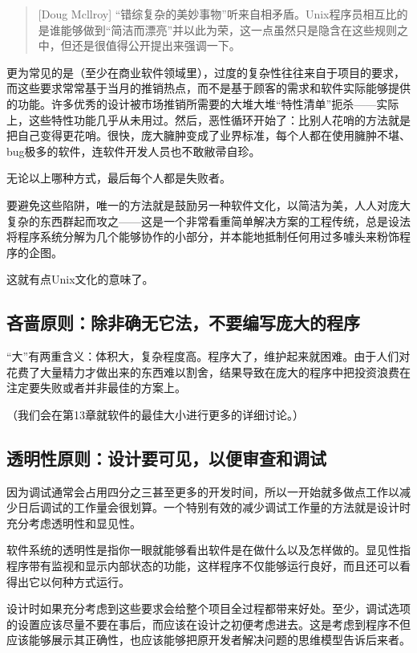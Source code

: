 \documentclass[11pt,oneside]{book}
\begin{document}
\begin{common-format}
\begin{quote}[Doug Mcllroy]
“错综复杂的美妙事物”听来自相矛盾。Unix程序员相互比的是谁能够做到“简洁而漂亮”并以此为荣，这一点虽然只是隐含在这些规则之中，但还是很值得公开提出来强调一下。
\end{quote}    

更为常见的是（至少在商业软件领域里），过度的复杂性往往来自于项目的要求，而这些要求常常基于当月的推销热点，而不是基于顾客的需求和软件实际能够提供的功能。许多优秀的设计被市场推销所需要的大堆大堆“特性清单”扼杀——实际上，这些特性功能几乎从未用过。然后，恶性循环开始了：比别人花哨的方法就是把自己变得更花哨。很快，庞大臃肿变成了业界标准，每个人都在使用臃肿不堪、bug极多的软件，连软件开发人员也不敢敝帚自珍。

无论以上哪种方式，最后每个人都是失败者。

要避免这些陷阱，唯一的方法就是鼓励另一种软件文化，以简洁为美，人人对庞大复杂的东西群起而攻之——这是一个非常看重简单解决方案的工程传统，总是设法将程序系统分解为几个能够协作的小部分，并本能地抵制任何用过多噱头来粉饰程序的企图。
    
这就有点Unix文化的意味了。


\subsection{吝啬原则：除非确无它法，不要编写庞大的程序}
“大”有两重含义：体积大，复杂程度高。程序大了，维护起来就困难。由于人们对花费了大量精力才做出来的东西难以割舍，结果导致在庞大的程序中把投资浪费在注定要失败或者并非最佳的方案上。

（我们会在第13章就软件的最佳大小进行更多的详细讨论。）

\subsection{透明性原则：设计要可见，以便审查和调试}
因为调试通常会占用四分之三甚至更多的开发时间，所以一开始就多做点工作以减少日后调试的工作量会很划算。一个特别有效的减少调试工作量的方法就是设计时充分考虑透明性和显见性。

软件系统的透明性是指你一眼就能够看出软件是在做什么以及怎样做的。显见性指程序带有监视和显示内部状态的功能，这样程序不仅能够运行良好，而且还可以看得出它以何种方式运行。

设计时如果充分考虑到这些要求会给整个项目全过程都带来好处。至少，调试选项的设置应该尽量不要在事后，而应该在设计之初便考虑进去。这是考虑到程序不但应该能够展示其正确性，也应该能够把原开发者解决问题的思维模型告诉后来者。


\end{common-format}
\end{document}
